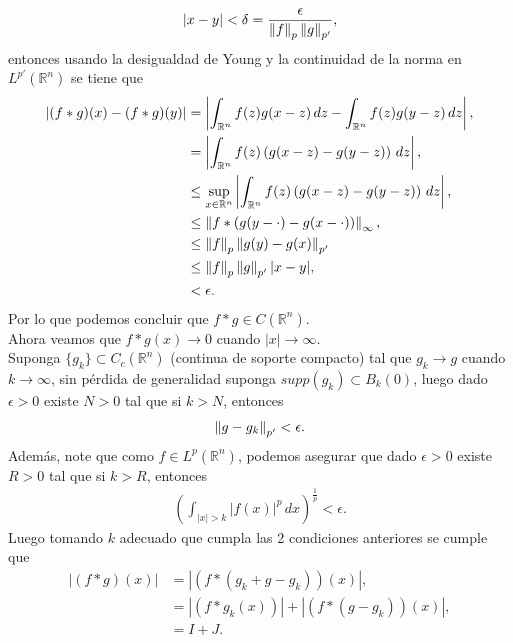 \begin{homeworkProblem}
\begin{solution}
\begin{enumerate}[(i)]
        \begin{align*}
          |x-y|< \delta = \frac{\epsilon}{\left\|f\right\|_p\left\|g\right\|_{p'}}, 
        \end{align*}
        entonces usando la desigualdad de Young y la continuidad de la norma en $L^{p'}(\mathbb{R}^{n})$ se tiene que
        \begin{align*}
          |(f*g)(x)-(f*g)(y)|&=\left| \int_{\mathbb{R}^{n}}f(z)g(x-z)\, dz-\int_{\mathbb{R}^{n}}f(z)g(y-z)\, dz \right|,\\
          &= \left| \int_{\mathbb{R}^{n}}f(z)\left( g(x-z)-g(y-z) \right)\, dz \right|,\\
          &\leq \sup_{x\in\mathbb{R}^{n}}\left| \int_{\mathbb{R}^{n}}f(z)\left( g(x-z)-g(y-z) \right)\, dz \right|,\\
          &\leq \left\|f*(g(y-\cdot)-g(x-\cdot))\right\|_{\infty},\\
          &\leq \left\|f\right\|_{p}\left\|g(y)-g(x)\right\|_{p'}\\
          &\leq \left\|f\right\|_{p}\left\|g\right\|_{p'}|x-y|,\\
          &< \epsilon. 
        \end{align*}
        Por lo que podemos concluir que $f*g\in C(\mathbb{R}^{n})$.\\
        Ahora veamos que $f*g(x)\to 0$ cuando $|x|\to\infty$.\\
        Suponga $\{g_{k}\}\subset C_{c}(\mathbb{R}^{n})$ (continua de soporte compacto) tal que $g_k\to g$ cuando $k\to\infty$, sin pérdida de generalidad suponga $supp(g_k)\subset B_{k}(0)$, luego dado $\epsilon>0$ existe $N>0$ tal que si $k>N$, entonces
        \begin{align*}
          \left\|g-g_k\right\|_{p'}<\epsilon.
        \end{align*}
        Además, note que como $f\in L^{p}(\mathbb{R}^{n})$, podemos asegurar que dado $\epsilon>0$ existe $R>0$ tal que si $k>R$, entonces
        \begin{align*}
          \left(\int_{|x|>k}|f(x)|^{p}\, dx\right)^{\frac{1}{p}}<\epsilon.
        \end{align*}
        Luego tomando $k$ adecuado que cumpla las 2 condiciones anteriores se cumple que 
        \begin{align*}
          \left| (f*g)(x) \right|&=\left| (f*(g_k+g-g_k))(x) \right|,\\
          &=\left| (f*g_{k}(x)) \right|+\left| (f*(g-g_{k}))(x) \right|,\\
          &= I + J.
        \end{align*}

\end{enumerate}
\end{solution}
\end{homeworkProblem}
